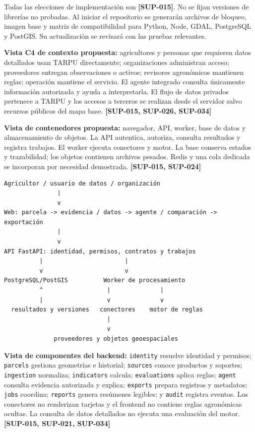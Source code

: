 \documentclass[10pt,a4paper]{article}
\begin{document}
Todas las elecciones de implementación son \textbf{[SUP-015]}. No se fijan versiones de librerías no probadas. Al iniciar el repositorio se generarán archivos de bloqueo, imagen base y matriz de compatibilidad para Python, Node, GDAL, PostgreSQL y PostGIS. Su actualización se revisará con las pruebas relevantes.


\textbf{Vista C4 de contexto propuesta:} agricultores y personas que requieren datos detallados usan TARPU directamente; organizaciones administran acceso; proveedores entregan observaciones o activos; revisores agronómicos mantienen reglas; operación mantiene el servicio. El agente integrado consulta únicamente información autorizada y ayuda a interpretarla. El flujo de datos privados pertenece a TARPU y los accesos a terceros se realizan desde el servidor salvo recursos públicos del mapa base. \textbf{[SUP-015, SUP-026, SUP-034]}


\textbf{Vista de contenedores propuesta:} navegador, API, worker, base de datos y almacenamiento de objetos. La API autentica, autoriza, consulta resultados y registra trabajos. El worker ejecuta conectores y motor. La base conserva estados y trazabilidad; los objetos contienen archivos pesados. Redis y una cola dedicada se incorporan por necesidad demostrada. \textbf{[SUP-015, SUP-024]}


\begin{lstlisting}
Agricultor / usuario de datos / organización
               |
               v
Web: parcela -> evidencia / datos -> agente / comparación -> exportación
               |
               v
API FastAPI: identidad, permisos, contratos y trabajos
          |                       |
          v                       v
PostgreSQL/PostGIS          Worker de procesamiento
          ^                  |              |
          |                  v              v
  resultados y versiones   conectores    motor de reglas
                             |
                             v
              proveedores y objetos geoespaciales
\end{lstlisting}

\textbf{Vista de componentes del backend:} \texttt{identity} resuelve identidad y permisos; \texttt{parcels} gestiona geometrías e historial; \texttt{sources} conoce productos y soportes; \texttt{ingestion} normaliza; \texttt{indicators} calcula; \texttt{evaluations} aplica reglas; \texttt{agent} consulta evidencia autorizada y explica; \texttt{exports} prepara registros y metadatos; \texttt{jobs} coordina; \texttt{reports} genera resúmenes legibles; y \texttt{audit} registra eventos. Los conectores no renderizan tarjetas y el frontend no contiene reglas agronómicas ocultas. La consulta de datos detallados no ejecuta una evaluación del motor. \textbf{[SUP-015, SUP-021, SUP-034]}
\end{document}
